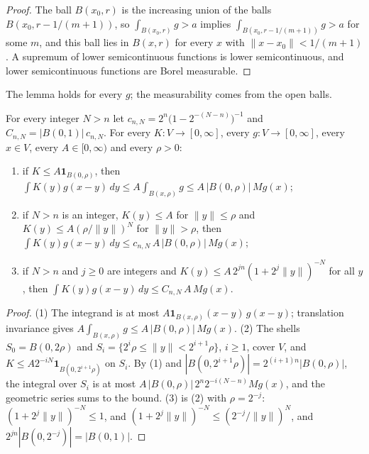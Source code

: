 \begin{proof}
\leanok
The ball $B(x_0, r)$ is the increasing union of the balls $B(x_0, r - 1/(m+1))$, so
$\int_{B(x_0, r)} g > a$ implies $\int_{B(x_0, r - 1/(m+1))} g > a$ for some $m$, and this ball
lies in $B(x, r)$ for every $x$ with $\|x - x_0\| < 1/(m+1)$. A supremum of lower semicontinuous
functions is lower semicontinuous, and lower semicontinuous functions are Borel measurable.
\end{proof}

The lemma holds for every $g$; the measurability comes from the open balls.

\begin{lemma}
\label{lem:maximal-function-kernels}
\leanok
{}
For every integer $N > n$ let $c_{n,N} = 2^n \bigl(1 - 2^{-(N - n)}\bigr)^{-1}$ and
$C_{n,N} = |B(0, 1)| \, c_{n,N}$. For every $K : V \to [0, \infty]$, every
$g : V \to [0, \infty]$, every $x \in V$, every $A \in [0, \infty)$ and every $\rho > 0$:
\begin{enumerate}
  \item if $K \leq A \mathbf 1_{B(0, \rho)}$, then
    $\int K(y) g(x - y) \, dy \leq A \int_{B(x, \rho)} g \leq A \, |B(0, \rho)| \, M g(x)$;
  \item if $N > n$ is an integer, $K(y) \leq A$ for $\|y\| \leq \rho$ and
    $K(y) \leq A (\rho / \|y\|)^N$ for $\|y\| > \rho$, then
    $\int K(y) g(x - y) \, dy \leq c_{n,N} \, A \, |B(0, \rho)| \, M g(x)$;
  \item if $N > n$ and $j \geq 0$ are integers and
    $K(y) \leq A \, 2^{jn} (1 + 2^j \|y\|)^{-N}$ for all $y$, then
    $\int K(y) g(x - y) \, dy \leq C_{n,N} \, A \, M g(x)$.
\end{enumerate}
\end{lemma}

\begin{proof}
\leanok
(1) The integrand is at most $A \mathbf 1_{B(x, \rho)}(x - y) \, g(x - y)$; translation
invariance gives $A \int_{B(x, \rho)} g \leq A \, |B(0, \rho)| \, M g(x)$. (2) The shells
$S_0 = B(0, 2\rho)$ and $S_i = \{2^i \rho \leq \|y\| < 2^{i+1} \rho\}$, $i \geq 1$, cover $V$,
and $K \leq A 2^{-iN} \mathbf 1_{B(0, 2^{i+1} \rho)}$ on $S_i$. By (1) and
$|B(0, 2^{i+1} \rho)| = 2^{(i+1) n} |B(0, \rho)|$, the integral over $S_i$ is at most
$A \, |B(0, \rho)| \, 2^n 2^{-i(N - n)} M g(x)$, and the geometric series sums to the bound.
(3) is (2) with $\rho = 2^{-j}$: $(1 + 2^j \|y\|)^{-N} \leq 1$, and
$(1 + 2^j \|y\|)^{-N} \leq (2^{-j} / \|y\|)^N$, and $2^{jn} |B(0, 2^{-j})| = |B(0, 1)|$.
\end{proof}

